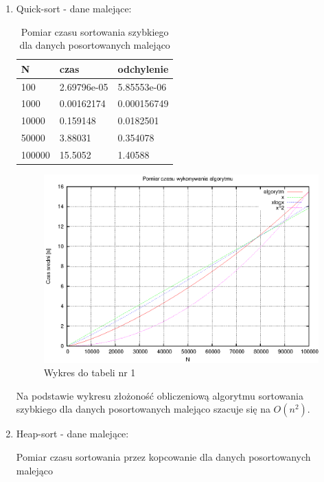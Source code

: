 \documentclass[a4paper,11pt]{article}
\begin{document}
\begin{enumerate}
 \item Quick-sort - dane malejące:
   
  \begin{table}[th]
  \centering
    \caption{Pomiar czasu sortowania szybkiego dla danych posortowanych malejąco}

      \begin{tabular}{|l|l|l|}
	\hline
	N & czas & odchylenie \\
    \hline
 100 & 2.69796e-05 & 5.85553e-06\\
 \hline
1000 & 0.00162174 & 0.000156749\\
\hline
10000 & 0.159148 & 0.0182501\\
\hline
50000 & 3.88031 & 0.354078\\
\hline
100000 & 15.5052 & 1.40588\\


\hline
    \end{tabular}
    \end{table}
 \begin{figure}[!h]
\centering
\includegraphics[width=1\textwidth]{../prj/wykres7.eps}
\caption{Wykres do tabeli nr 1}
\label{Wykres do tabeli nr 1}
\end{figure} 
\newpage
Na podstawie wykresu złożoność obliczeniową algorytmu sortowania szybkiego dla danych posortowanych malejąco szacuje się na $ O(n^{2}) $.

 \item Heap-sort - dane malejące:
   
  \begin{table}[th]
  \centering
    \caption{Pomiar czasu sortowania przez kopcowanie dla danych posortowanych malejąco}


\end{table}
\end{enumerate}
\end{document}
